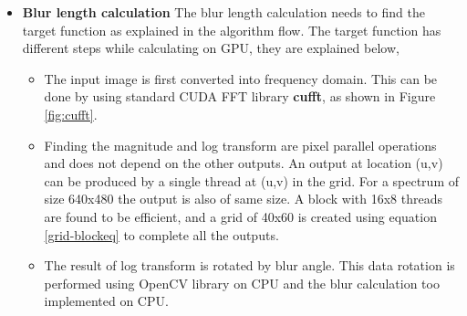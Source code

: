 \begin{itemize}
\begin{itemize}
	\item A block size of 16x8 is considered, and a 2D grid of size 40x60 is created using Equation \ref{grid-blockeq} to complete the operation for all pixels.
	\item From the Figure \ref{fig:radon threadaccess} , at an angle of $30^o$, the first projection location is (0,242), the horizontal 0.5 distant second projection is (0,242). The verical 0.5 distant third projection location is calculated as (0,243) and fourth projection with 0.5 distant in both directions is (0,243).\\
\end{itemize}
\begin{figure}[h!]
	\centering
	\texttt{[image: radonThread.png]}
	\caption{CUDA kernel for calculating Radon transform for a spectrum of size 640x480}
	\label{fig:radon threadaccess}
\end{figure}
\item \textbf{Blur length calculation} \hfill \break
The blur length calculation needs to find the target function as explained in the algorithm flow. The target function has different steps while calculating on GPU, they are explained below,
\begin{itemize}
	\item The input image is first converted into frequency domain. This can be done by using standard CUDA FFT library \textbf{cufft}, as shown in Figure \ref{fig:cufft}.
	\item Finding the magnitude and log transform are pixel parallel operations and does not depend on the other outputs. An output at location (u,v) can be produced by a single thread at (u,v) in the grid. For a spectrum of size 640x480 the output is also of same size. A block with 16x8 threads are found to be efficient, and a grid of 40x60 is created using equation \ref{grid-blockeq} to complete all the outputs.
	\item The result of log transform is rotated by blur angle. This data rotation is performed using OpenCV library on CPU and the blur calculation too implemented on CPU.
\end{itemize}
\end{itemize} 
